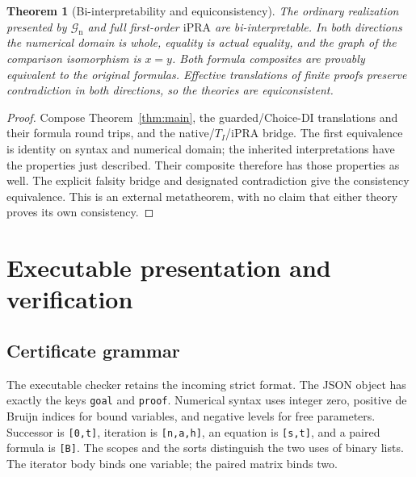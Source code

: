 \documentclass[11pt]{article}
\newtheorem{theorem}{Theorem}[section]
\theoremstyle{definition}\newtheorem{definition}[theorem]{Definition}
\theoremstyle{remark}\newtheorem{remark}[theorem]{Remark}
\newcommand{\Gn}{\mathcal G_{\mathrm n}}
\newcommand{\ipra}{\mathrm{iPRA}}
\newcommand{\code}[1]{\texttt{#1}}
\begin{document}
\begin{theorem}[Bi-interpretability and equiconsistency]
The ordinary realization presented by $\Gn$ and full first-order
$\ipra$ are bi-interpretable. In both directions the numerical domain
is whole, equality is actual equality, and the graph of the
comparison isomorphism is $x=y$. Both formula composites are provably
equivalent to the original formulas. Effective translations of finite
proofs preserve contradiction in both directions, so the theories
are equiconsistent.
\end{theorem}
\begin{proof}
Compose Theorem~\ref{thm:main}, the guarded/Choice-DI translations
and their formula round trips, and the native/$T_I$/$\ipra$ bridge.
The first equivalence is identity on syntax and numerical domain;
the inherited interpretations have the properties just described.
Their composite therefore has those properties as well. The explicit
falsity bridge and designated contradiction give the consistency
equivalence. This is an external metatheorem, with no claim that
either theory proves its own consistency.
\end{proof}

\section{Executable presentation and verification}
\label{sec:implementation}

\subsection{Certificate grammar}

The executable checker retains the incoming strict format. The JSON
object has exactly the keys \code{goal} and \code{proof}. Numerical
syntax uses integer zero, positive de Bruijn indices for bound
variables, and negative levels for free parameters. Successor is
\code{[0,t]}, iteration is \code{[n,a,h]}, an equation is \code{[s,t]},
and a paired formula is \code{[B]}. The scopes and the sorts distinguish
the two uses of binary lists. The iterator body binds one variable;
the paired matrix binds two.
\end{document}
